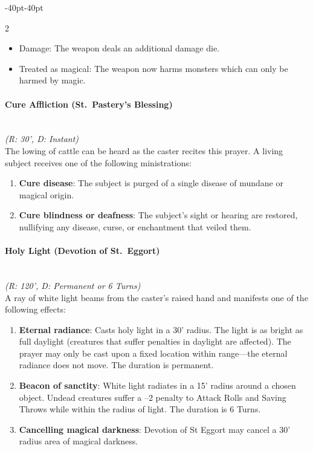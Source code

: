 \documentclass{book}
\providecommand{\tightlist}{%
\setlength{\itemsep}{0pt}\setlength{\parskip}{0pt}}
\begin{document}
\begin{adjustwidth}{-40pt}{-40pt}
\begin{multicols}{2}
\begin{itemize}
	\tightlist
	\item
	Damage: The weapon deals an additional damage die.
	\item
	Treated as magical: The weapon now harms monsters which can only be
	harmed by magic.
\end{itemize}

\paragraph{Cure Affliction (St.~Pastery's
	Blessing)}\label{cure-affliction-st.-pasterys-blessing}\mbox{}\\
\emph{(R: 30', D: Instant)}\\
The lowing of cattle can be heard as the caster recites this prayer. A
living subject receives one of the following ministrations:

\begin{enumerate}
	\def\labelenumi{\arabic{enumi}.}
	\tightlist
	\item
	\textbf{Cure disease}: The subject is purged of a single disease of
	mundane or magical origin.
	\item
	\textbf{Cure blindness or deafness}: The subject's sight or hearing
	are restored, nullifying any disease, curse, or enchantment that
	veiled them.
\end{enumerate}

\paragraph{Holy Light (Devotion of
	St.~Eggort)}\label{holy-light-devotion-of-st.-eggort}\mbox{}\\
\emph{(R: 120', D: Permanent or 6 Turns)}\\
A ray of white light beams from the caster's raised hand and manifests
one of the following effects:

\begin{enumerate}
	\def\labelenumi{\arabic{enumi}.}
	\tightlist
	\item
	\textbf{Eternal radiance}: Casts holy light in a 30' radius. The light
	is as bright as full daylight (creatures that suffer penalties in
	daylight are affected). The prayer may only be cast upon a fixed
	location within range---the eternal radiance does not move. The
	duration is permanent.
	\item
	\textbf{Beacon of sanctity}: White light radiates in a 15' radius
	around a chosen object. Undead creatures suffer a --2 penalty to
	Attack Rolls and Saving Throws while within the radius of light. The
	duration is 6 Turns.
	\item
	\textbf{Cancelling magical darkness}: Devotion of St Eggort may cancel
	a 30' radius area of magical darkness.
\end{enumerate}


\end{multicols}
\end{adjustwidth}
\end{document}
